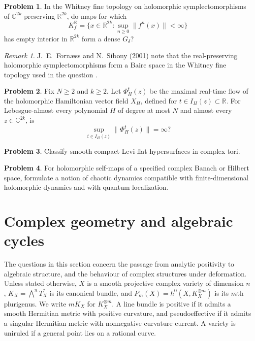 \documentclass[11pt,reqno]{amsart}
\theoremstyle{definition}
\newtheorem{problem}{Problem}[section]
\theoremstyle{remark}
\newtheorem*{remark}{Remark}
\begin{document}
\begin{problem}\label{FS-2.25}
In the Whitney fine topology on holomorphic symplectomorphisms of $\mathbb C^{2k}$ preserving $\mathbb R^{2k}$, do maps for which
\[
 K_f^{\mathbb R}=\{x\in\mathbb R^{2k}:\sup_{n\geq0}\|f^n(x)\|<\infty\}
\]
has empty interior in $\mathbb R^{2k}$ form a dense $G_\delta$?
\end{problem}
\begin{remark}
J.~E.~Forn\ae ss and N.~Sibony (2001) note that the real-preserving holomorphic symplectomorphisms form a Baire space in the Whitney fine topology used in the question \cite[Question~2.25]{FS2001}.
\end{remark}

\begin{problem}\label{FS-2.30}
Fix $N\geq2$ and $k\geq2$. Let $\Phi_H^t(z)$ be the maximal real-time flow of the holomorphic Hamiltonian vector field $X_H$, defined for $t\in I_H(z)\subset\mathbb R$. For Lebesgue-almost every polynomial $H$ of degree at most $N$ and almost every $z\in\mathbb C^{2k}$, is
\[
 \sup_{t\in I_H(z)}\|\Phi_H^t(z)\|=\infty?
\]
\end{problem}


\begin{problem}\label{FS-3.10b}
Classify smooth compact Levi-flat hypersurfaces in complex tori.
\end{problem}


\begin{problem}\label{FS-2.13}
For holomorphic self-maps of a specified complex Banach or Hilbert space, formulate a notion of chaotic dynamics compatible with finite-dimensional holomorphic dynamics and with quantum localization.
\end{problem}


\section{Complex geometry and algebraic cycles}
The questions in this section concern the passage from analytic positivity to algebraic structure, and the behaviour of complex structures under deformation. Unless stated otherwise, $X$ is a smooth projective complex variety of dimension $n$, $K_X=\bigwedge^n T_X^*$ is its canonical bundle, and $P_m(X)=h^0(X,K_X^{\otimes m})$ is its $m$th plurigenus. We write $mK_X$ for $K_X^{\otimes m}$. A line bundle is positive if it admits a smooth Hermitian metric with positive curvature, and pseudoeffective if it admits a singular Hermitian metric with nonnegative curvature current. A variety is uniruled if a general point lies on a rational curve.
\end{document}

